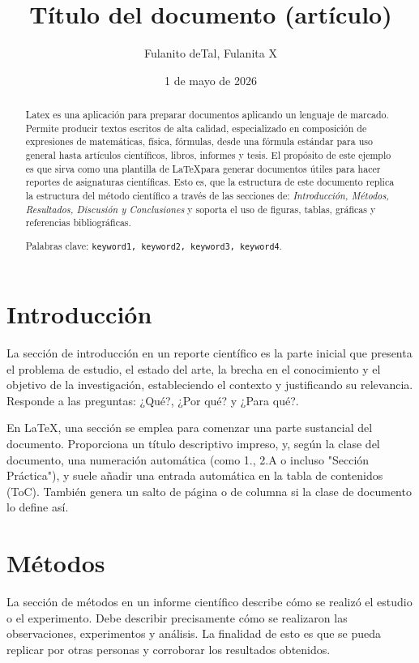 \documentclass[12pt,letter]{article}
\title{Título del documento (artículo)}
\author{Fulanito deTal, Fulanita X}
\date{1 de mayo de 2026}
\begin{document}
\maketitle

\begin{abstract}
          
Latex es una aplicación para preparar documentos aplicando un
lenguaje de marcado. Permite producir textos escritos de alta calidad,
especializado en composición de expresiones de matemáticas, física,
fórmulas, desde una fórmula estándar para uso general hasta artículos
científicos, libros, informes y tesis. El propósito de este ejemplo es
que sirva como una plantilla de \LaTeX para generar documentos útiles
para hacer reportes de asignaturas científicas. Esto es, que la
estructura de este documento replica la estructura del método
científico a través de las secciones de: {\em Introducción, Métodos,
  Resultados, Discusión y Conclusiones} y soporta el uso de figuras,
tablas, gráficas y referencias bibliográficas.  


\vspace{1cm}
\noindent Palabras clave: \texttt{keyword1, keyword2, keyword3, keyword4}.

\end{abstract}  
\section{Introducción}

La sección de introducción en un reporte científico es la parte
inicial que presenta el problema de estudio, el estado del arte, la
brecha en el conocimiento y el objetivo de la investigación,
estableciendo el contexto y justificando su relevancia.
Responde a las preguntas: ¿Qué?, ¿Por qué? y ¿Para qué?.

En LaTeX, una sección se emplea para comenzar una parte
sustancial del documento. Proporciona un título descriptivo impreso,
y, según la clase del documento, una numeración automática (como 1.,
2.A o incluso "Sección Práctica"), y suele añadir una entrada
automática en la tabla de contenidos (ToC). También genera un salto de
página o de columna si la clase de documento lo define así.

\section{Métodos}

La sección de métodos en un informe científico describe cómo se
realizó el estudio o el experimento. Debe describir precisamente cómo
se realizaron las observaciones, experimentos y análisis. La finalidad
de esto es que se pueda replicar por otras personas y corroborar los
resultados obtenidos.
\end{document}
